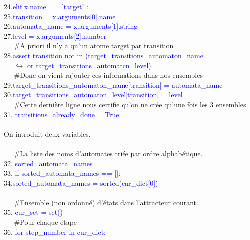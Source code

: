 \documentclass[12pt,a4paper]{article}
\begin{document}
{			24.\qquad\qquad\qquad\textcolor{blue}{elif x.name == 'target' :}\\
				25.\qquad\qquad\qquad\qquad\textcolor{blue}{transition = x.arguments[0].name}\\
				26.\qquad\qquad\qquad\qquad\textcolor{blue}{automata\_name = x.arguments[1].string}\\
				27.\qquad\qquad\qquad\qquad\textcolor{blue}{level = x.arguments[2].number}\\
				\textcolor{white}{3ch}\qquad\qquad\qquad\qquad\#A priori il n'y a qu'un atome target par transition\\
				28.\qquad\qquad\qquad\qquad\textcolor{blue}{assert transition not in (target\_transitions\_automaton\_name}\\
				\textcolor{white}{3ch}\qquad\qquad\qquad\qquad\qquad$\hookrightarrow$ \textcolor{blue}{or target\_transitions\_automaton\_level)}\\
				\textcolor{white}{3ch}\qquad\qquad\qquad\qquad\#Donc on vient rajouter ces informations dans nos ensembles\\
				29.\qquad\qquad\qquad\qquad\textcolor{blue}{target\_transitions\_automaton\_name[transition] = automata\_name}\\
				30.\qquad\qquad\qquad\qquad\textcolor{blue}{target\_transitions\_automaton\_level[transition] = level}\\
	\textcolor{white}{3ch}\#Cette dernière ligne nous certifie qu'on ne crée qu'une fois les 3 ensembles\\
	31. \textcolor{blue}{transitions\_already\_done = True}\\ \\
	On introduit deux variables.\\ \\
	\textcolor{white}{3ch}\#La liste des noms d'automates triée par ordre alphabétique.\\
	32. \textcolor{blue}{sorted\_automata\_names == []}\\
	33. \textcolor{blue}{if sorted\_automata\_names == []:}\\
		34.\qquad\textcolor{blue}{sorted\_automata\_names = sorted(cur\_dict[0])}\\ \\
	\textcolor{white}{3ch}\#Ensemble (non ordonné) d'états dans l'attracteur courant.\\
	35. \textcolor{blue}{cur\_set = set()}\\
	\textcolor{white}{3ch}\#Pour chaque étape\\
	36. \textcolor{blue}{for step\_number in cur\_dict:}\\
}
\end{document}
